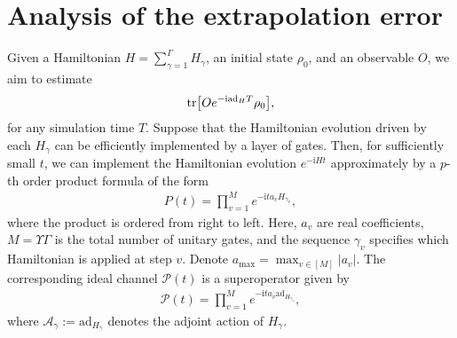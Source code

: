 \documentclass[11pt]{article}
\renewcommand{\i}{\mathrm{i}}
\newcommand{\ad}{\mathrm{ad}}
\renewcommand{\P}{\mathcal{P}}
\newcommand{\A}{\mathcal{A}}
\begin{document}
\section{Analysis of the extrapolation error}
Given a Hamiltonian $H = \sum_{\gamma=1}^{\Gamma} H_{\gamma}$, an initial state $\rho_0$, and an observable $O$, we aim to estimate \begin{align*}
    \tr[Oe^{-\i \ad_H T} \rho_0],
\end{align*}
for any simulation time $T$.
Suppose that the Hamiltonian evolution driven by each $H_{\gamma}$ can be efficiently implemented by a layer of gates. Then, for sufficiently small $t$, we can implement the Hamiltonian evolution $e^{-\i H t}$ approximately by a $p$-th order product formula of the form
\begin{align*}
    P(t) = \prod_{v=1}^Me^{-\i t a_{v} H_{\gamma_v}},
\end{align*}
where the product is ordered from right to left. Here, $a_{v}$ are real coefficients, $M = \Upsilon\Gamma$ is the total number of unitary gates, and the sequence $\gamma_v$ specifies which Hamiltonian is applied at step $v$. Denote $a_{\max} = \max_{v\in [M]} |a_v|$. The corresponding ideal channel $\P(t)$ is a superoperator given by
\begin{align*}
    \P(t) = \prod_{v=1}^Me^{-\i t a_{v} \ad_{H_{\gamma_v}}},
\end{align*}
where $\A_{\gamma}:=\ad_{H_{\gamma}}$ denotes the adjoint action of $H_{\gamma}$. 
\end{document}
